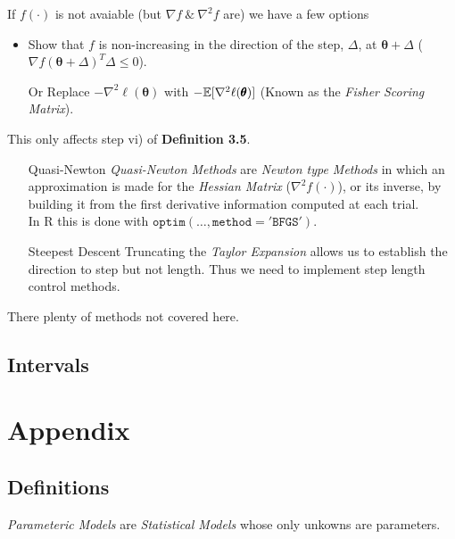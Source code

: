 \documentclass[11pt,a4paper]{article}
\begin{document}

If $f(\cdot)$ is not avaiable (but $\nabla f\ \&\ \nabla^2 f$ are) we have a few options
\begin{itemize}
	\item Show that $f$ is non-increasing in the direction of the step, $\Delta$, at $\pmb\theta+\Delta$ (\ie $\nabla f(\pmb\theta+\Delta)^T\Delta\leq0$).
	\item[Or] Replace $-\nabla^2 \ell(\pmb\theta)$ with $-\mathbb{E}[\nabla^2\ell(\pmb\theta)]$ (Known as the \textit{Fisher Scoring Matrix}).
\end{itemize}
\nb This only affects step vi) of \textbf{Definition 3.5}.\\

\begin{itemize}
	\item[Quasi-Newton] \textit{Quasi-Newton Methods} are \textit{Newton type Methods} in which an approximation is made for the \textit{Hessian Matrix} ($\nabla^2 f(\cdot)$), or its inverse, by building it from the first derivative information computed at each trial.\\
	\nb In R this is done with $\mathtt{optim(\dots,method='BFGS')}$.
	\item[Steepest Descent] Truncating the \textit{Taylor Expansion} allows us to establish the direction to step but not length. Thus we need to implement step length control methods.
\end{itemize}
\nb There plenty of methods not covered here.

\subsection{Intervals}

\newpage\setcounter{section}{-1}
\section{Appendix}

\subsection{Definitions}

\textit{Parameteric Models} are \textit{Statistical Models} whose only unkowns are parameters.\\
\end{document}
